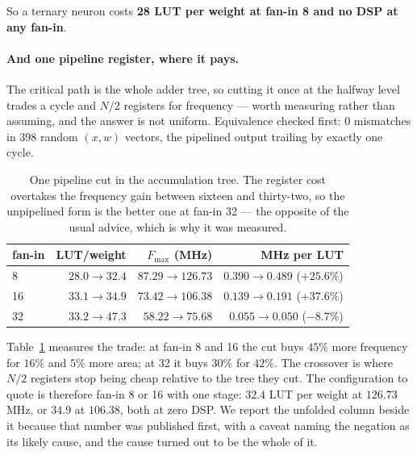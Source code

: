 \documentclass[11pt]{article}
\theoremstyle{definition}
\begin{document}
So a ternary neuron costs \textbf{28 LUT per weight at fan-in 8 and no DSP at
any fan-in}.

\paragraph{And one pipeline register, where it pays.} The critical path is the
whole adder tree, so cutting it once at the halfway level trades a cycle and
$N/2$ registers for frequency --- worth measuring rather than assuming, and the
answer is not uniform. Equivalence checked first: $0$ mismatches in $398$ random
$(x,w)$ vectors, the pipelined output trailing by exactly one cycle.

\begin{table}[t]\centering
\caption{One pipeline cut in the accumulation tree. The register cost overtakes
the frequency gain between sixteen and thirty-two, so the unpipelined form is
the better one at fan-in 32 --- the opposite of the usual advice, which is why it
was measured.}
\label{tab:nodepipe}
\begin{tabular}{lrrr}
\toprule
fan-in & LUT/weight & $F_{\max}$ (MHz) & MHz per LUT \\
\midrule
8  & $28.0\to\mathbf{32.4}$ & $87.29\to\mathbf{126.73}$ & $0.390\to0.489$ (\textbf{$+25.6\%$}) \\
16 & $33.1\to\mathbf{34.9}$ & $73.42\to\mathbf{106.38}$ & $0.139\to0.191$ (\textbf{$+37.6\%$}) \\
32 & $33.2\to47.3$ & $58.22\to75.68$ & $0.055\to0.050$ ($-8.7\%$) \\
\bottomrule
\end{tabular}
\end{table}

Table~\ref{tab:nodepipe} measures the trade: at fan-in 8 and 16 the cut buys $45\%$
more frequency for $16\%$ and $5\%$ more area; at 32 it buys $30\%$ for $42\%$. The crossover is where $N/2$ registers
stop being cheap relative to the tree they cut. The configuration to quote is
therefore fan-in 8 or 16 with one stage: $32.4$ LUT per weight at $126.73$\,MHz,
or $34.9$ at $106.38$, both at zero DSP. We report the unfolded column beside it because that number was
published first, with a caveat naming the negation as its likely cause, and the
cause turned out to be the whole of it.
\end{document}
